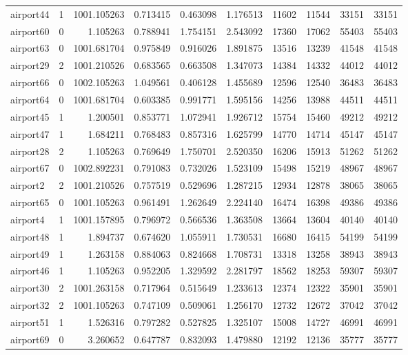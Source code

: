 \begin{longtable}{|l|r|r|r|r|r|r|r|r|r|}
airport44 & 1 & 1001.105263 & 0.713415 & 0.463098 & 1.176513 & 11602 & 11544 & 33151 & 33151 \\
airport60 & 0 & 1.105263 & 0.788941 & 1.754151 & 2.543092 & 17360 & 17062 & 55403 & 55403 \\
airport63 & 0 & 1001.681704 & 0.975849 & 0.916026 & 1.891875 & 13516 & 13239 & 41548 & 41548 \\
airport29 & 2 & 1001.210526 & 0.683565 & 0.663508 & 1.347073 & 14384 & 14332 & 44012 & 44012 \\
airport66 & 0 & 1002.105263 & 1.049561 & 0.406128 & 1.455689 & 12596 & 12540 & 36483 & 36483 \\
airport64 & 0 & 1001.681704 & 0.603385 & 0.991771 & 1.595156 & 14256 & 13988 & 44511 & 44511 \\
airport45 & 1 & 1.200501 & 0.853771 & 1.072941 & 1.926712 & 15754 & 15460 & 49212 & 49212 \\
airport47 & 1 & 1.684211 & 0.768483 & 0.857316 & 1.625799 & 14770 & 14714 & 45147 & 45147 \\
airport28 & 2 & 1.105263 & 0.769649 & 1.750701 & 2.520350 & 16206 & 15913 & 51262 & 51262 \\
airport67 & 0 & 1002.892231 & 0.791083 & 0.732026 & 1.523109 & 15498 & 15219 & 48967 & 48967 \\
airport2 & 2 & 1001.210526 & 0.757519 & 0.529696 & 1.287215 & 12934 & 12878 & 38065 & 38065 \\
airport65 & 0 & 1001.105263 & 0.961491 & 1.262649 & 2.224140 & 16474 & 16398 & 49386 & 49386 \\
airport4 & 1 & 1001.157895 & 0.796972 & 0.566536 & 1.363508 & 13664 & 13604 & 40140 & 40140 \\
airport48 & 1 & 1.894737 & 0.674620 & 1.055911 & 1.730531 & 16680 & 16415 & 54199 & 54199 \\
airport49 & 1 & 1.263158 & 0.884063 & 0.824668 & 1.708731 & 13318 & 13258 & 38943 & 38943 \\
airport46 & 1 & 1.105263 & 0.952205 & 1.329592 & 2.281797 & 18562 & 18253 & 59307 & 59307 \\
airport30 & 2 & 1001.263158 & 0.717964 & 0.515649 & 1.233613 & 12374 & 12322 & 35901 & 35901 \\
airport32 & 2 & 1001.105263 & 0.747109 & 0.509061 & 1.256170 & 12732 & 12672 & 37042 & 37042 \\
airport51 & 1 & 1.526316 & 0.797282 & 0.527825 & 1.325107 & 15008 & 14727 & 46991 & 46991 \\
airport69 & 0 & 3.260652 & 0.647787 & 0.832093 & 1.479880 & 12192 & 12136 & 35777 & 35777 \\

\end{longtable}
